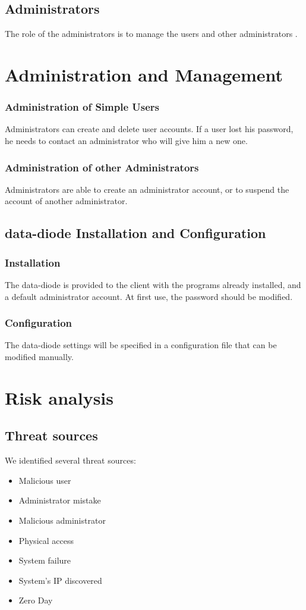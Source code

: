 \documentclass[a4paper,11pt]{article}
\begin{document}
\subsection{Administrators}
The role of the administrators is to manage the users and other administrators .
\section{Administration and Management}
\subsubsection{Administration of Simple Users}
Administrators can create and delete user accounts. If a user lost his password, he needs to contact an administrator who will give him a new one.

\subsubsection{Administration of other Administrators}
Administrators are able to create an administrator account, or to suspend the account of another administrator.
\subsection{data-diode Installation and Configuration}
\subsubsection{Installation}
The data-diode is provided to the client with the programs already installed, and a default administrator account. At first use, the password should be modified.
\subsubsection{Configuration}
The data-diode settings will be specified in a configuration file that can be modified manually.
\section{Risk analysis}
\subsection{Threat sources}
We identified several threat sources:\\
\begin{itemize}
\item Malicious user
\item Administrator mistake
\item Malicious administrator
\item Physical access
\item System failure
\item System's IP discovered
\item Zero Day
\end{itemize}
\end{document}
